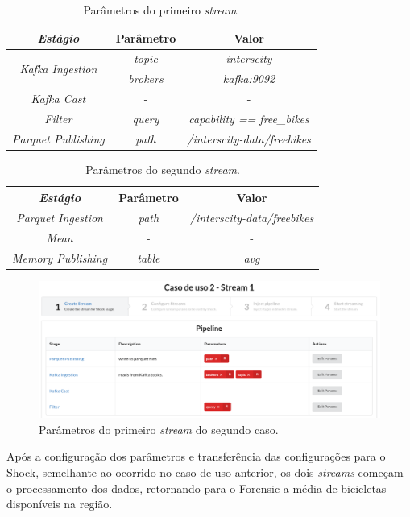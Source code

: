 \begin{table}[]
    \centering
    \caption{Parâmetros do primeiro \textit{stream}.}
    \label{tab:case2-1}
    \begin{tabular}{|c|c|c|}
        \hline
        \textit{\textbf{Estágio}}                   & \textbf{Parâmetro} & \textbf{Valor}                      \\ \hline
        \multirow{2}{*}{\textit{Kafka Ingestion}} & \textit{topic}     & \textit{interscity}                 \\ \cline{2-3} 
                                                  & \textit{brokers}   & \textit{kafka:9092}                 \\ \hline
                                                  \textit{Kafka Cast}                       & -                  & -                                   \\ \hline
                                                  \textit{Filter}                           & \textit{query}     & \textit{capability == free\_bikes}  \\ \hline
                                                  \textit{Parquet Publishing}               & \textit{path}      & \textit{/interscity-data/freebikes} \\ \hline
    \end{tabular}
\end{table}

\begin{table}[]
\centering
    \caption{Parâmetros do segundo \textit{stream}.}
\label{tab:case2-2}
\begin{tabular}{|c|c|c|}
\hline
\textit{\textbf{Estágio}}    & \textbf{Parâmetro} & \textbf{Valor}                      \\ \hline
\textit{Parquet Ingestion} & \textit{path}      & \textit{/interscity-data/freebikes} \\ \hline
\textit{Mean}              & -                  & -                                   \\ \hline
\textit{Memory Publishing} & \textit{table}     & \textit{avg}                        \\ \hline
\end{tabular}
\end{table}


\begin{figure}
  \centering
  \includegraphics[width=\textwidth]{figuras/caso2-1.png}
  \caption{Parâmetros do primeiro \textit{stream} do segundo caso.}
  \label{fig:case2}
\end{figure}

Após a configuração dos parâmetros e transferência das configurações para o
Shock, semelhante ao ocorrido no caso de uso anterior, os dois \textit{streams}
começam o processamento dos dados, retornando para o Forensic a média de
bicicletas disponíveis na região.
